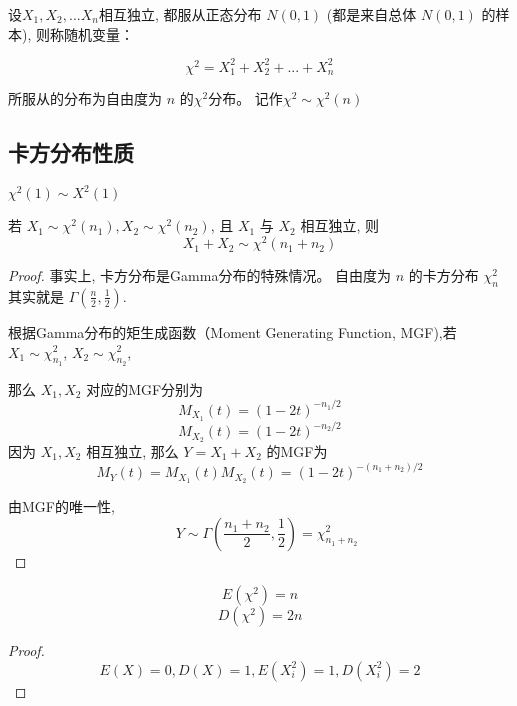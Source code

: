 \begin{definition}[卡方分布]
    设$X_1,X_2,...X_n$相互独立, 都服从正态分布 $N(0,1)$ (都是来自总体 $N(0,1)$ 的样本), 则称随机变量：

    $$
        \chi^2 = X_1^2 + X_2^2 + ... + X_n^2
    $$

    所服从的分布为自由度为 $n$ 的$\chi^2$分布。 记作$\chi^2 \sim \chi^2(n)$
\end{definition}

\subsection{卡方分布性质}

\begin{corollary}
    $\chi^2(1) \sim X^2(1)$
\end{corollary}

\begin{corollary}
    若 $ X_{1} \sim \chi^{2}\left(n_{1}\right), X_{2} \sim \chi^{2}\left(n_{2}\right) $, 且 $ X_{1} $ 与 $ X_{2} $ 相互独立, 则
    $$
        X_{1}+X_{2} \sim \chi^{2}\left(n_{1}+n_{2}\right)
    $$
\end{corollary}

\begin{proof}
    事实上, 卡方分布是Gamma分布的特殊情况。 自由度为 $ n $ 的卡方分布 $ \chi_{n}^{2} $ 其实就是 $ \Gamma\left(\frac{n}{2}, \frac{1}{2}\right) $.

    根据Gamma分布的矩生成函数（Moment Generating Function, MGF),若$ X_{1} \sim \chi_{n_{1}}^{2} $, $ X_{2} \sim \chi_{n_{2}}^{2} $,

    那么 $ X_{1}, X_{2} $ 对应的MGF分别为
    $$ M_{X_{1}}(t)=(1-2 t)^{-n_{1} / 2} $$
    $$ M_{X_{2}}(t)=(1-2 t)^{-n_{2} / 2} $$
    因为 $ X_{1}, X_{2} $ 相互独立, 那么 $ Y=X_{1}+X_{2} $ 的MGF为
    $$ M_{Y}(t)=M_{X_{1}}(t) M_{X_{2}}(t)=(1-2 t)^{-\left(n_{1}+n_{2}\right) / 2} $$

    由MGF的唯一性,
    $$ \quad Y \sim \Gamma\left(\frac{n_{1}+n_{2}}{2}, \frac{1}{2}\right)=\chi_{n_{1}+n_{2}}^{2} $$
\end{proof}

\begin{corollary}
    $$E(\chi^2) = n$$
    $$D(\chi^2) = 2n$$
\end{corollary}

\begin{proof}
    $$
        E(X) = 0,
        D(X) = 1,
        E(X_i^2) = 1,
        D(X_i^2) = 2
    $$
\end{proof}

